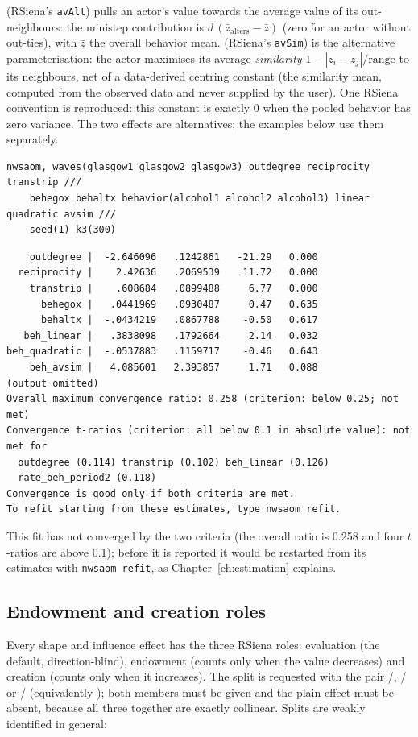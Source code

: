  (RSiena's \texttt{avAlt}) pulls an actor's value towards the average value of its out-neighbours: the ministep contribution is $d\,(\bar z_{\mathrm{alters}} - \bar z)$ (zero for an actor without out-ties), with $\bar z$ the overall behavior mean.  (RSiena's \texttt{avSim}) is the alternative parameterisation: the actor maximises its average \emph{similarity} $1 - |z_i - z_j|/\text{range}$ to its neighbours, net of a data-derived centring constant (the similarity mean, computed from the observed data and never supplied by the user). One RSiena convention is reproduced: this constant is exactly 0 when the pooled behavior has zero variance. The two effects are alternatives; the examples below use them separately.

\begin{lstlisting}
nwsaom, waves(glasgow1 glasgow2 glasgow3) outdegree reciprocity transtrip ///
    behegox behaltx behavior(alcohol1 alcohol2 alcohol3) linear quadratic avsim ///
    seed(1) k3(300)
\end{lstlisting}
\begin{lstlisting}
    outdegree |  -2.646096   .1242861   -21.29   0.000
  reciprocity |    2.42636   .2069539    11.72   0.000
    transtrip |    .608684   .0899488     6.77   0.000
      behegox |   .0441969   .0930487     0.47   0.635
      behaltx |  -.0434219   .0867788    -0.50   0.617
   beh_linear |   .3838098   .1792664     2.14   0.032
beh_quadratic |  -.0537883   .1159717    -0.46   0.643
    beh_avsim |   4.085601   2.393857     1.71   0.088
(output omitted)
Overall maximum convergence ratio: 0.258 (criterion: below 0.25; not met)
Convergence t-ratios (criterion: all below 0.1 in absolute value): not met for
  outdegree (0.114) transtrip (0.102) beh_linear (0.126)
  rate_beh_period2 (0.118)
Convergence is good only if both criteria are met.
To refit starting from these estimates, type nwsaom refit.
\end{lstlisting}
This fit has not converged by the two criteria (the overall ratio is 0.258 and four $t$-ratios are above 0.1); before it is reported it would be restarted from its estimates with \texttt{nwsaom refit}, as Chapter~\ref{ch:estimation} explains.

\subsection{Endowment and creation roles}

Every shape and influence effect has the three RSiena roles: evaluation (the default, direction-blind), endowment (counts only when the value decreases) and creation (counts only when it increases). The split is requested with the pair /, / or / (equivalently ); both members must be given and the plain effect must be absent, because all three together are exactly collinear. Splits are weakly identified in general:

